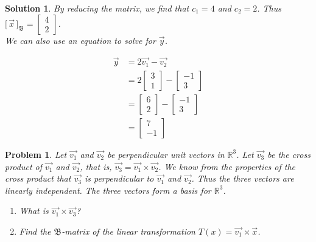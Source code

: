\documentclass{article}
\newtheorem{problem}{Problem}
\newtheorem*{solution}{Solution}
\newcommand{\Coord}[2]{\Bigg[ \, \vec{#1} \, \Bigg]_{\mathfrak{#2}}}
\begin{document}
\begin{solution}
By reducing the matrix, we find that $c_{1}  = 4$ and $c_{2} = 2$. Thus $\Coord{x}{B} = \begin{bmatrix} 4 \\ 2 \end{bmatrix}$. \\

We can also use an equation to solve for $\vec{y}$.

\begin{align*}
\vec{y} &= 2 \vec{v_{1}} - \vec{v_{2}} \\
&= 2 \begin{bmatrix}3 \\ 1 \end{bmatrix} - \begin{bmatrix} -1 \\ 3 \end{bmatrix} \\
&= \begin{bmatrix} 6 \\ 2 \end{bmatrix} - \begin{bmatrix} -1 \\ 3 \end{bmatrix} \\
&= \begin{bmatrix} 7 \\ -1 \end{bmatrix}
\end{align*}
\end{solution}

\begin{problem}
Let $\vec{v_{1}}$ and $\vec{v_{2}}$ be perpendicular unit vectors in $\mathbb{R}^3$. Let $\vec{v_{3}}$ be the cross product of $\vec{v_{1}}$ and $\vec{v_{2}}$, that is, $\vec{v_{3}} = \vec{v_{1}} \times \vec{v_{2}}$. We know from the properties of the cross product that $\vec{v_{3}}$ is perpendicular to $\vec{v_{1}}$ and $\vec{v_{2}}$. Thus the three vectors are linearly independent. The three vectors form a basis for $\mathbb{R}^3$.

\begin{enumerate}
\item What is $\vec{v_{1}} \times \vec{v_{3}}$?
\item Find the $\mathfrak{B}$-matrix of the linear transformation $T(x) = \vec{v_{1}} \times \vec{x}$.
\end{enumerate}
\end{problem}
\end{document}
